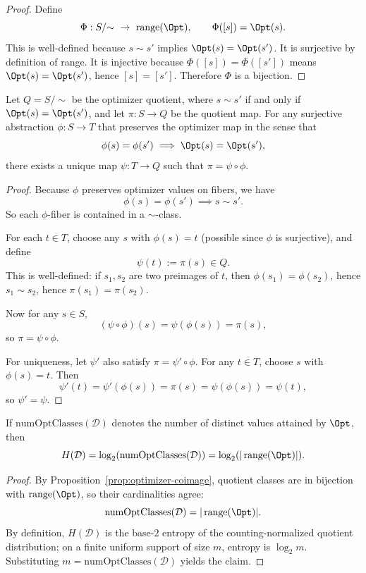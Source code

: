 \begin{proof}
Define
\[
\Phi: S/{\sim}\ \to\ \operatorname{range}(\Opt),\qquad \Phi([s])=\Opt(s).
\]
This is well-defined because $s\sim s'$ implies $\Opt(s)=\Opt(s')$. It is surjective by definition of range. It is injective because $\Phi([s])=\Phi([s'])$ means $\Opt(s)=\Opt(s')$, hence $[s]=[s']$. Therefore $\Phi$ is a bijection.
\end{proof}

\begin{theorem}\label{thm:quotient-universal}
Let $Q=S/{\sim}$ be the optimizer quotient, where $s \sim s'$ if and only if $\Opt(s)=\Opt(s')$, and let $\pi:S\to Q$ be the quotient map. For any surjective abstraction $\phi:S\to T$ that preserves the optimizer map in the sense that
\[
\phi(s)=\phi(s') \implies \Opt(s)=\Opt(s'),
\]
there exists a unique map $\psi:T\to Q$ such that $\pi=\psi\circ\phi$.
\end{theorem}

\begin{proof}
Because $\phi$ preserves optimizer values on fibers, we have
\[
\phi(s)=\phi(s') \implies s\sim s'.
\]
So each $\phi$-fiber is contained in a $\sim$-class.

For each $t\in T$, choose any $s$ with $\phi(s)=t$ (possible since $\phi$ is surjective), and define
\[
\psi(t):=\pi(s)\in Q.
\]
This is well-defined: if $s_1,s_2$ are two preimages of $t$, then $\phi(s_1)=\phi(s_2)$, hence $s_1\sim s_2$, hence $\pi(s_1)=\pi(s_2)$.

Now for any $s\in S$,
\[
(\psi\circ\phi)(s)=\psi(\phi(s))=\pi(s),
\]
so $\pi=\psi\circ\phi$.

For uniqueness, let $\psi'$ also satisfy $\pi=\psi'\circ\phi$. For any $t\in T$, choose $s$ with $\phi(s)=t$. Then
\[
\psi'(t)=\psi'(\phi(s))=\pi(s)=\psi(\phi(s))=\psi(t),
\]
so $\psi'=\psi$.
\end{proof}

\begin{proposition}\label{prop:optimizer-entropy-image}
If $\mathrm{numOptClasses}(\mathcal{D})$ denotes the number of distinct values attained by $\Opt$, then
\[
H(\mathcal{D}) = \log_2(\mathrm{numOptClasses}(\mathcal{D}))
=
\log_2(|\operatorname{range}(\Opt)|).
\]
\end{proposition}

\begin{proof}
By Proposition~\ref{prop:optimizer-coimage}, quotient classes are in bijection with $\operatorname{range}(\Opt)$, so their cardinalities agree:
\[
\mathrm{numOptClasses}(\mathcal{D})=|\operatorname{range}(\Opt)|.
\]
By definition, $H(\mathcal{D})$ is the base-$2$ entropy of the counting-normalized quotient distribution; on a finite uniform support of size $m$, entropy is $\log_2 m$. Substituting $m=\mathrm{numOptClasses}(\mathcal{D})$ yields the claim.
\end{proof}

